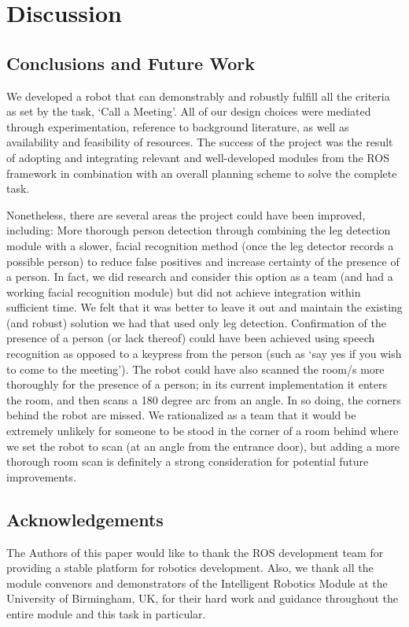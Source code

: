 \documentclass{article}
\begin{document}
    \section{Discussion}
    \subsection{Conclusions and Future Work}
    We developed a robot that  can demonstrably and robustly fulfill all the criteria as set by the task, ‘Call a Meeting’. All of our design choices were mediated through experimentation, reference to background literature, as well as availability and feasibility of resources. The success of the project was the result of adopting and integrating relevant and well-developed modules from the ROS framework in combination with an overall planning scheme to solve the complete task.

	Nonetheless, there are several areas the project could have been improved, including:  More thorough person detection through combining the leg detection module with a slower, facial recognition method (once the leg detector records a possible person) to reduce false positives and increase certainty of the presence of a person. In fact, we did research and consider this option as a team (and had a working facial recognition module) but did not achieve integration within sufficient time. We felt that it was better to leave it out and maintain the existing (and robust) solution we had that used only leg detection. Confirmation of the presence of a person (or lack thereof) could have been achieved using speech recognition as opposed to a keypress from the person (such as ‘say yes if you wish to come to the meeting’). The robot could have also scanned the room/s more thoroughly for the presence of a person; in its current implementation it enters the room, and then scans a 180 degree arc from an angle. In so doing, the corners behind the robot are missed. We rationalized as a team that it would be extremely unlikely for someone to be stood in the corner of a room behind where we set the robot to scan (at an angle from the entrance door), but adding a more thorough room scan is definitely a strong consideration for potential future improvements.
	
	\subsection{Acknowledgements}
	The Authors of this paper would like to thank the ROS development team for providing a stable platform for robotics development. Also, we thank all the module convenors and demonstrators of the Intelligent Robotics Module at the University of Birmingham, UK, for their hard work and guidance throughout the entire module and this task in particular.    
\end{document}
